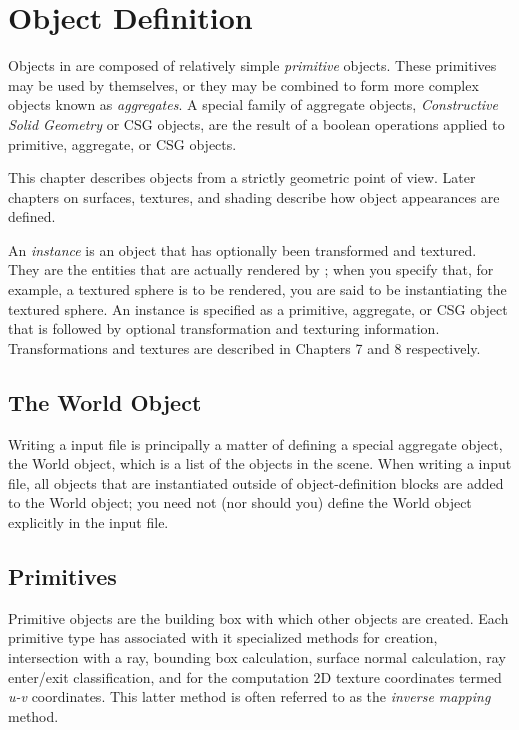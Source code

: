 \chapter{Object Definition}

Objects in {\rayshade} are composed of relatively simple {\em primitive}
objects.  These primitives may be used by themselves, or they
may be combined to form more complex objects known as {\em aggregates}.
A special family of aggregate objects,
{\em Constructive Solid Geometry} or CSG
objects, are the result of a boolean operations applied to
primitive, aggregate, or CSG objects.

This chapter describes objects from a strictly geometric point of
view.  Later chapters on surfaces, textures, and shading describe
how object appearances are defined.

An {\em instance} is an object that has optionally been transformed
and
textured.  They are the entities that are actually rendered by
{\rayshade}; when you specify that, for example, a textured
sphere is to be rendered, you are said to be instantiating
the textured sphere.
An instance
is specified as a primitive, aggregate, or CSG object that
is followed by optional transformation and texturing information.
Transformations and textures are described in Chapters 7 and 8 respectively.

\section{The World Object}

Writing a {\rayshade} input file is principally
a matter of defining a special aggregate object, the World object,
which is a list of the objects in the scene.  When writing a {\rayshade}
input file, all objects that are instantiated outside of object-definition
blocks are added to the World object; you need not (nor should you)
define the World object explicitly in the input file.

\section{Primitives}

Primitive objects are the building box with which other objects are
created.  Each primitive type has associated with it specialized
methods for
creation,
intersection with a ray,
bounding box calculation,
surface normal calculation,
ray enter/exit classification,
and for the computation 2D texture coordinates termed {\em u-v}
coordinates.
This latter method is often referred to as the {\em inverse mapping}
method.

